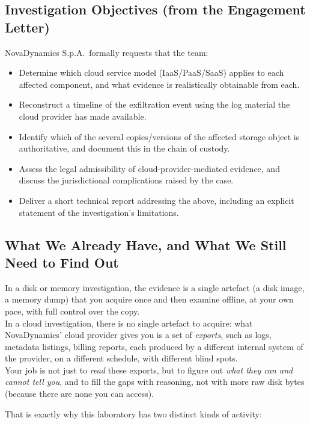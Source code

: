 \subsection{Investigation Objectives (from the Engagement Letter)}
NovaDynamics S.p.A.\ formally requests that the team:
\begin{itemize}[leftmargin=1.2cm]
	\item Determine which cloud service model (IaaS/PaaS/SaaS) applies to each affected
	      component, and what evidence is realistically obtainable from each.
	\item Reconstruct a timeline of the exfiltration event using the log material the cloud
	      provider has made available.
	\item Identify which of the several copies/versions of the affected storage object is
	      authoritative, and document this in the chain of custody.
	\item Assess the legal admissibility of cloud-provider-mediated evidence, and discuss the
	      jurisdictional complications raised by the case.
	\item Deliver a short technical report addressing the above, including an explicit
	      statement of the investigation's limitations.
\end{itemize}

\subsection{What We Already Have, and What We Still Need to Find Out}

In a disk or memory investigation, the evidence is a single artefact (a disk image, a memory dump) that you acquire once and then examine offline, at your own pace, with full control over the copy. \\
In a cloud investigation, there is no single artefact to acquire: what NovaDynamics' cloud provider gives you is a set of \emph{exports}, such as logs, metadata listings, billing reports, each produced by a different internal system of the provider, on a different schedule, with
different blind spots.\\
Your job is not just to \emph{read} these exports, but to figure out \emph{what they can and cannot tell you}, and to fill the gaps with reasoning, not with more raw
disk bytes (because there are none you can access).
\medskip

\noindent
That is exactly why this laboratory has two distinct kinds of activity:

